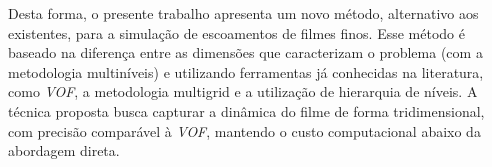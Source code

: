 Desta forma, o presente trabalho apresenta um novo método, alternativo aos existentes, para a simulação de escoamentos de filmes finos. Esse método é baseado na diferença entre as dimensões que caracterizam o problema (com a metodologia multiníveis) e utilizando ferramentas já conhecidas na literatura, como \textit{VOF}, a metodologia multigrid e a utilização de hierarquia de níveis. A técnica proposta busca capturar a dinâmica do filme de forma tridimensional, com precisão comparável à \textit{VOF}, mantendo o custo computacional abaixo da abordagem direta.









